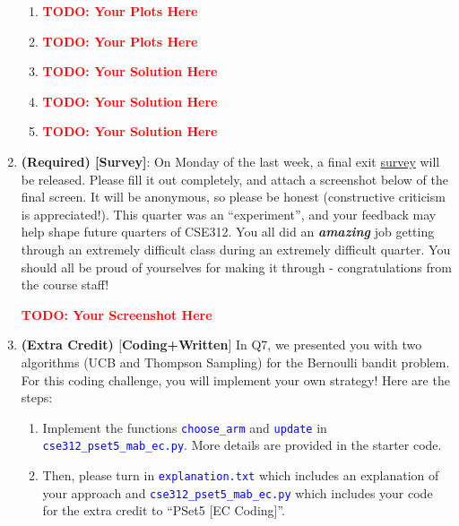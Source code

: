 \documentclass[12pt]{article}
\def\todo#1{\textcolor{red}{\textbf{#1}}}
\def\code#1{\textcolor{blue}{\texttt{#1}}}
\renewcommand{\|}{\mid}
\begin{document}
\begin{enumerate}
\begin{tcolorbox}
\begin{enumerate}
\item \todo{TODO: Your Plots Here}
\item \todo{TODO: Your Plots Here}
\item \todo{TODO: Your Solution Here}
\item \todo{TODO: Your Solution Here}
\item \todo{TODO: Your Solution Here}
\end{enumerate}
\end{tcolorbox}

\item \textbf{(Required) [Survey]}: On Monday of the last week, a final exit \textcolor{blue}{\href{https://docs.google.com/forms/d/e/1FAIpQLSdWPVsD4z0wZdrdqLP6tmneV0nqbYRgfFMUIpW_t3ph2iVNwQ/viewform?usp=sf_link}{survey}} will be released. Please fill it out completely, and attach a screenshot below of the final screen. It will be anonymous, so please be honest (constructive criticism is appreciated!). This quarter was an ``experiment'', and your feedback may help shape future quarters of CSE312. You all did an \textit{\textbf{amazing}} job getting through an extremely difficult class during an extremely difficult quarter. You should all be proud of yourselves for making it through - congratulations from the course staff!
\begin{tcolorbox}
\begin{center}
\todo{TODO: Your Screenshot Here}
\end{center}
\end{tcolorbox}

\item \textbf{(Extra Credit) $[$Coding+Written$]$} In Q7, we presented you with two algorithms (UCB and Thompson Sampling) for the Bernoulli bandit problem. For this coding challenge, you will implement your own strategy! Here are the steps:


\begin{enumerate}[label=\Roman*.]
    \item  Implement the functions \code{choose\_arm} and \code{update} in \code{cse312\_pset5\_mab\_ec.py}. More details are provided in the starter code.
    \item Then, please turn in \code{explanation.txt} which includes an explanation of your approach and \code{cse312\_pset5\_mab\_ec.py} which includes your code for the extra credit to ``PSet5 [EC Coding]''. 
\end{enumerate}


\end{enumerate}
\end{document}
